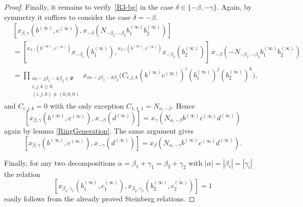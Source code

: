 \documentclass{article}
\numberwithin{equation}{section}
\theoremstyle{definition}
\theoremstyle{remark}
\newcommand{\up}[2]{{^{#1}\!{#2}}}
\begin{document}
\begin{proof}
 Finally, it remains to verify~\eqref{R3-bg} in the case $\delta \in \{-\beta, -\gamma\}$.
 Again, by symmetry it suffices to consider the case $\delta = -\beta$.
 \begin{align*}
  &[x_{\beta, \gamma}(b^{(\infty)}, c^{(\infty)}),
  x_{-\beta}(N_{-\beta_1, -\beta_2} b_1^{(\infty)} b_2^{(\infty)})]\\
  &= [\up{x_{\beta, \gamma}(b^{(\infty)}, c^{(\infty)})}
   {x_{-\beta_1}(b_1^{(\infty)})},
  \up{x_{\beta, \gamma}(b^{(\infty)}, c^{(\infty)})}
   {x_{-\beta_2}(b_2^{(\infty)})}]\,
  x_{-\beta}(-N_{-\beta_1, -\beta_2} b_1^{(\infty)} b_2^{(\infty)})\\
  &= \prod_{\substack{i\alpha - j\beta_1 - k\beta_2 \in \Phi\\ i, j, k \geq 0\\ (i, j, k) \neq (0, 0, 0)}}
  x_{i\alpha - j\beta_1 - k\beta_2}\bigl(C_{i, j, k} (b^{(\infty)} c^{(\infty)})^i (b_1^{(\infty)})^j (b_2^{(\infty)})^k\bigr),
 \end{align*}
 and \(C_{i, j, k} = 0\) with the only exception \(C_{1, 1, 1} = N_{\alpha, -\beta}\). Hence
 \[[x_{\beta, \gamma}(b^{(\infty)}, c^{(\infty)}), x_{-\beta}(d^{(\infty)})] = x_\gamma(N_{\alpha, -\beta} b^{(\infty)} c^{(\infty)} d^{(\infty)})\]
 again by lemma \ref{RingGeneration}. The same argument gives
 \[[x_{\beta, \gamma}(b^{(\infty)}, c^{(\infty)}), x_{-\gamma}(d^{(\infty)})] = x_\beta(N_{\alpha, -\gamma} b^{(\infty)} c^{(\infty)} d^{(\infty)}).\]

 Finally, for any two decompositions \(\alpha = \beta_1 + \gamma_1 = \beta_2 + \gamma_2\) with \(|\alpha| = |\beta_i| = |\gamma_i|\) the relation
 \[[x_{\beta_1, \gamma_1}(b_1^{(\infty)}, c_1^{(\infty)}),
 x_{\beta_2, \gamma_2}(b_2^{(\infty)}, c_2^{(\infty)})] = 1\]
 easily follows from the already proved Steinberg relations.
\end{proof}
\end{document}

